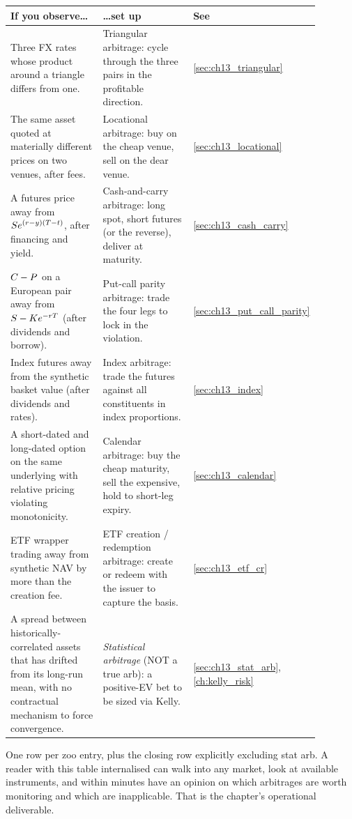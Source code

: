 \renewcommand{\arraystretch}{1.3}
\begin{center}
\begin{tabular}{p{0.34\linewidth} p{0.34\linewidth} p{0.20\linewidth}}
\toprule
\textbf{If you observe\ldots} & \textbf{\ldots set up} & \textbf{See} \\
\midrule
Three FX rates whose product around a triangle differs from
one. &
Triangular arbitrage: cycle through the three pairs in the
profitable direction. &
\cref{sec:ch13_triangular} \\
\midrule
The same asset quoted at materially different prices on two
venues, after fees. &
Locational arbitrage: buy on the cheap venue, sell on the
dear venue. &
\cref{sec:ch13_locational} \\
\midrule
A futures price away from $S e^{(r - y)(T-t)}$, after
financing and yield. &
Cash-and-carry arbitrage: long spot, short futures (or the
reverse), deliver at maturity. &
\cref{sec:ch13_cash_carry} \\
\midrule
$C - P$ on a European pair away from $S - K
e^{-r T}$ (after dividends and borrow). &
Put-call parity arbitrage: trade the four legs to lock in the
violation. &
\cref{sec:ch13_put_call_parity} \\
\midrule
Index futures away from the synthetic basket value (after
dividends and rates). &
Index arbitrage: trade the futures against all constituents
in index proportions. &
\cref{sec:ch13_index} \\
\midrule
A short-dated and long-dated option on the same underlying
with relative pricing violating monotonicity. &
Calendar arbitrage: buy the cheap maturity, sell the
expensive, hold to short-leg expiry. &
\cref{sec:ch13_calendar} \\
\midrule
ETF wrapper trading away from synthetic NAV by more than the
creation fee. &
ETF creation / redemption arbitrage: create or redeem with
the issuer to capture the basis. &
\cref{sec:ch13_etf_cr} \\
\midrule
A spread between historically-correlated assets that has
drifted from its long-run mean, with no contractual mechanism
to force convergence. &
\emph{Statistical arbitrage} (NOT a true arb): a positive-EV
bet to be sized via Kelly. &
\cref{sec:ch13_stat_arb}, \cref{ch:kelly_risk} \\
\bottomrule
\end{tabular}
\end{center}

One row per zoo entry, plus the closing row explicitly
excluding stat arb. A reader with this table internalised can
walk into any market, look at available instruments, and
within minutes have an opinion on which arbitrages are worth
monitoring and which are inapplicable. That is the
chapter's operational deliverable.

